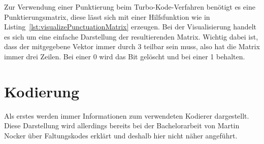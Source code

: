 Zur Verwendung einer Punktierung beim Turbo-Kode-Verfahren benötigt es eine Punktierungsmatrix, diese lässt sich mit einer Hilfsfunktion wie in Listing~\ref{lst:visualizePunctuationMatrix} erzeugen. Bei der Visualisierung handelt es sich um eine einfache Darstellung der resultierenden Matrix. Wichtig dabei ist, dass der mitgegebene Vektor immer durch 3 teilbar sein muss, also hat die Matrix immer drei Zeilen. Bei einer 0 wird das Bit gelöscht und bei einer 1 behalten.

\FloatBarrier
\section{Kodierung}
\label{sec:visualization_encode}
Als erstes werden immer Informationen zum verwendeten Kodierer dargestellt. Diese Darstellung wird allerdings bereits bei der Bachelorarbeit von Martin Nocker über Faltungskodes erklärt und deshalb hier nicht näher angeführt. \cite{nocker}

